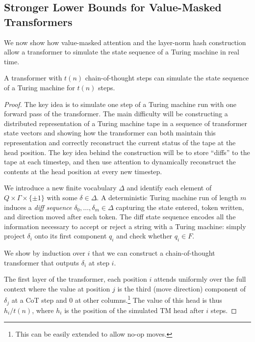 \subsection{Stronger Lower Bounds for Value-Masked Transformers}

We now show how value-masked attention and the layer-norm hash construction allow a transformer to simulate the state sequence of a Turing machine in real time.

\begin{theorem} \label{thm:lower-bound}
    A  transformer with $t(n)$ chain-of-thought steps can simulate the state sequence of a Turing machine for $t(n)$ steps.
\end{theorem}

\begin{proof}
    The key idea is to simulate one step of a Turing machine run with one forward pass of the transformer. The main difficulty will be constructing a distributed representation of a Turing machine tape in a sequence of transformer state vectors and showing how the transformer can both maintain this representation and correctly reconstruct the current status of the tape at the head position. The key idea behind the construction will be to store ``diffs'' to the tape at each timestep, and then use attention to dynamically reconstruct the contents at the head position at every new timestep.

    We introduce a new finite vocabulary $\Delta$ and identify each element of $Q \times \Gamma \times \{\pm 1 \}$ with some $\delta \in \Delta$. A deterministic Turing machine run of length $m$ induces a \emph{diff sequence} $\delta_0, \ldots, \delta_m \in \Delta$ capturing the state entered, token written, and direction moved after each token.
    The diff state sequence encodes all the information necessary to accept or reject a string with a Turing machine: simply project $\delta_i$ onto its first component $q_i$ and check whether $q_i \in F$.

    We show by induction over $i$ that we can construct a chain-of-thought transformer that outputs $\delta_i$ at step $i$.

    The first layer of the transformer, each position $i$ attends uniformly over the full context where the value at position $j$ is the third (move direction) component of $\delta_j$ at a CoT step and $0$ at other columns.\footnote{This can be easily extended to allow no-op moves.} The value of this head is thus $h_i/t(n)$, where $h_i$ is the position of the simulated TM head after $i$ steps.


\end{proof}
